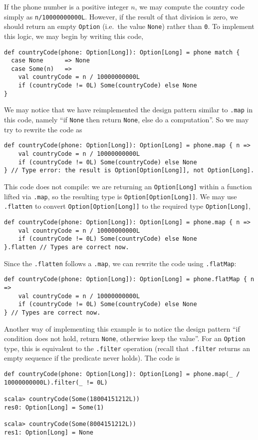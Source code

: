 If the phone number is a positive integer $n$, we may compute the
country code simply as \lstinline!n/10000000000L!. However, if the
result of that division is zero, we should return an empty \lstinline!Option!
(i.e.~the value \lstinline!None!) rather than \lstinline!0!. To
implement this logic, we may begin by writing this code,
\begin{lstlisting}
def countryCode(phone: Option[Long]): Option[Long] = phone match {
  case None      => None
  case Some(n)   =>
    val countryCode = n / 10000000000L
    if (countryCode != 0L) Some(countryCode) else None 
}
\end{lstlisting}
We may notice that we have reimplemented the design pattern similar
to \lstinline!.map! in this code, namely ``if \lstinline!None!
then return \lstinline!None!, else do a computation''. So we may
try to rewrite the code as
\begin{lstlisting}
def countryCode(phone: Option[Long]): Option[Long] = phone.map { n =>
    val countryCode = n / 10000000000L
    if (countryCode != 0L) Some(countryCode) else None 
} // Type error: the result is Option[Option[Long]], not Option[Long].
\end{lstlisting}
This code does not compile: we are returning an \lstinline!Option[Long]!
within a function lifted via \lstinline!.map!, so the resulting type
is \lstinline!Option[Option[Long]]!. We may use \lstinline!.flatten!
to convert \lstinline!Option[Option[Long]]! to the required type
\lstinline!Option[Long]!,
\begin{lstlisting}
def countryCode(phone: Option[Long]): Option[Long] = phone.map { n =>
    val countryCode = n / 10000000000L
    if (countryCode != 0L) Some(countryCode) else None 
}.flatten // Types are correct now.
\end{lstlisting}
Since the \lstinline!.flatten! follows a \lstinline!.map!, we can
rewrite the code using \lstinline!.flatMap!:
\begin{lstlisting}
def countryCode(phone: Option[Long]): Option[Long] = phone.flatMap { n =>
    val countryCode = n / 10000000000L
    if (countryCode != 0L) Some(countryCode) else None 
} // Types are correct now.
\end{lstlisting}
Another way of implementing this example is to notice the design pattern
``if condition does not hold, return \lstinline!None!, otherwise
keep the value''. For an \lstinline!Option! type, this is equivalent
to the \lstinline!.filter! operation (recall that \lstinline!.filter!
returns an empty sequence if the predicate never holds). The code
is
\begin{lstlisting}
def countryCode(phone: Option[Long]): Option[Long] = phone.map(_ / 10000000000L).filter(_ != 0L)

scala> countryCode(Some(18004151212L))
res0: Option[Long] = Some(1)

scala> countryCode(Some(8004151212L))
res1: Option[Long] = None
\end{lstlisting}


